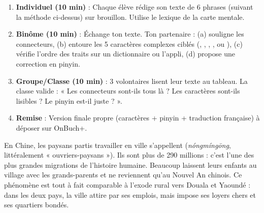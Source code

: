 \documentclass[11pt]{article}
\newcommand{\zh}[1]{\ifmmode\text{#1}\else{#1}\fi}
\begin{document}
\begin{experience}
\begin{enumerate}
\item \textbf{Individuel (10 min)} : Chaque élève rédige son texte de 6 phrases (suivant la méthode ci-dessus) sur brouillon. Utilise le lexique de la carte mentale.
\item \textbf{Binôme (10 min)} : Échange ton texte. Ton partenaire : (a) souligne les connecteurs, (b) entoure les 5 caractères complexes ciblés (\zh{搬}, \zh{拥}, \zh{挤}, \zh{租}, \zh{温} ou \zh{得}), (c) vérifie l'ordre des traits sur un dictionnaire ou l'appli, (d) propose une correction en pinyin.
\item \textbf{Groupe/Classe (10 min)} : 3 volontaires lisent leur texte au tableau. La classe valide : « Les connecteurs sont-ils tous là ? Les caractères sont-ils lisibles ? Le pinyin est-il juste ? ».
\item \textbf{Remise} : Version finale propre (caractères + pinyin + traduction française) à déposer sur OnBuch+.
\end{enumerate}
\end{experience}

\begin{savaistu}
En Chine, les paysans partis travailler en ville s'appellent \zh{农民工} (\emph{nóngmíngōng}, littéralement « ouvriers-paysans »). Ils sont plus de 290 millions : c'est l'une des plus grandes migrations de l'histoire humaine. Beaucoup laissent leurs enfants au village avec les grands-parents et ne reviennent qu'au Nouvel An chinois. Ce phénomène est tout à fait comparable à l'exode rural vers Douala et Yaoundé : dans les deux pays, la ville attire par ses emplois, mais impose ses loyers chers et ses quartiers bondés.
\end{savaistu}
\end{document}
